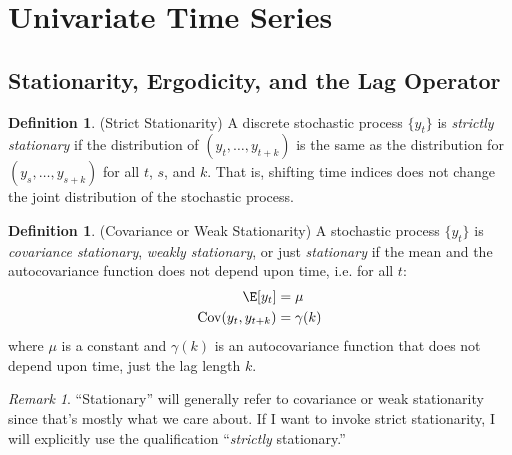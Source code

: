 \documentclass[12pt]{article}
\theoremstyle{plain}
\theoremstyle{definition}
\newtheorem{defn}[thm]{Definition}
\theoremstyle{remark}
\newtheorem*{rmk}{Remark}
\newcommand{\Cov}{\operatorname{Cov}}
\begin{document}






\clearpage
\section{Univariate Time Series}



\subsection{Stationarity, Ergodicity, and the Lag Operator}

\begin{defn}(Strict Stationarity)
A discrete stochastic process $\{y_t\}$ is \emph{strictly stationary} if
the distribution of $(y_t,\ldots,y_{t+k})$ is the same as the
distribution for $(y_s,\ldots,y_{s+k})$ for all $t$, $s$, and $k$. That
is, shifting time indices does not change the joint distribution of the
stochastic process.
\end{defn}

\begin{defn}(Covariance or Weak Stationarity)
A stochastic process $\{y_t\}$ is \emph{covariance stationary},
\emph{weakly stationary}, or just \emph{stationary} if the mean and the
autocovariance function does not depend upon time, i.e. for all $t$:
\begin{align*}
  \E[y_t] &= \mu \\
  \Cov(y_t,y_{t+k}) &= \gamma(k)
\end{align*}
where $\mu$ is a constant and $\gamma(k)$ is an autocovariance function
that does not depend upon time, just the lag length $k$.
\end{defn}
\begin{rmk}
``Stationary'' will generally refer to covariance or weak stationarity
since that's mostly what we care about. If I want to invoke strict
stationarity, I will explicitly use the qualification ``\emph{strictly}
stationary.''
\end{rmk}
\end{document}
